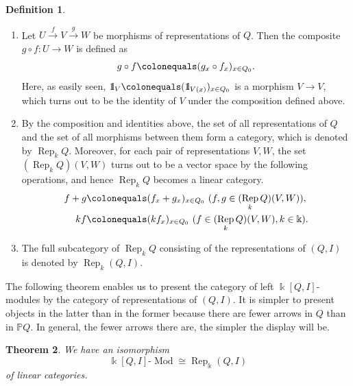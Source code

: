 \documentclass{surv-l}
\numberwithin{equation}{chapter}
\numberwithin{figure}{chapter}
\theoremstyle{plain}
\newtheorem{thm}{Theorem}[section]
\theoremstyle{definition}
\newtheorem{dfn}[thm]{Definition}
\theoremstyle{remark}
\newcommand{\id}{1\kern-.25em{\text{{\rm l}}}}
\newcommand{\lMod}{\text{-}\!\Mod}
\DeclareMathOperator{\Rep}{Rep}
\DeclareMathOperator{\Mod}{Mod}
\begin{document}
\begin{dfn}
\begin{enumerate}
\item
Let $U \xrightarrow{f} V \xrightarrow{g} W$ be morphisms of representations of $Q$.
Then the composite $g \circ f \colon U \to W$ is defined as
\[
g \circ f\colonequals  (g_x \circ f_x)_{x\in Q_0}.
\]
Here, as easily seen,
$\id_V\colonequals  (\id_{V(x)})_{x\in Q_0}$ is a morphism $ V \to V$, which
turns out to be the identity of $V$ under the composition defined above.
\item
By the composition and identities above,
the set of all representations of $Q$ and the set of all morphisms between them
form a category, which is denoted by $\Rep_k Q$.
Moreover, for each pair of representations
$V, W$, the set $(\Rep_k Q)(V, W)$ turns out to be a vector space
by the following operations, and hence $\Rep_k Q$ becomes a linear category.
\[
\begin{aligned}
f + g&\colonequals  (f_x + g_x)_{x\in Q_0} \ (f, g \in (\Rep_k Q)(V, W)),\\
kf&\colonequals  (kf_x)_{x\in Q_0} \ (f \in (\Rep_k Q)(V, W), k \in \Bbbk).
\end{aligned}
\]
\item
The full subcategory of $\Rep_k Q$ consisting of the representations of
$(Q, I)$ is denoted by $\Rep_k(Q, I)$.
\end{enumerate}
\end{dfn}

The following theorem enables us to present the category of left $\Bbbk[Q, I]$-modules
by the category of representations of $(Q, I)$.
It is simpler to present objects in the latter than in the former
because there are fewer arrows in $Q$ than in $\mathbb{P} Q$.
In general, the fewer arrows there are, the simpler the display will be.
\begin{thm}\label{thm:iso-mod-rep}
We have an isomorphism
\[
\Bbbk [Q, I]\lMod \cong  \Rep_\Bbbk (Q, I)
\]
of linear categories.
\end{thm}
\end{document}
